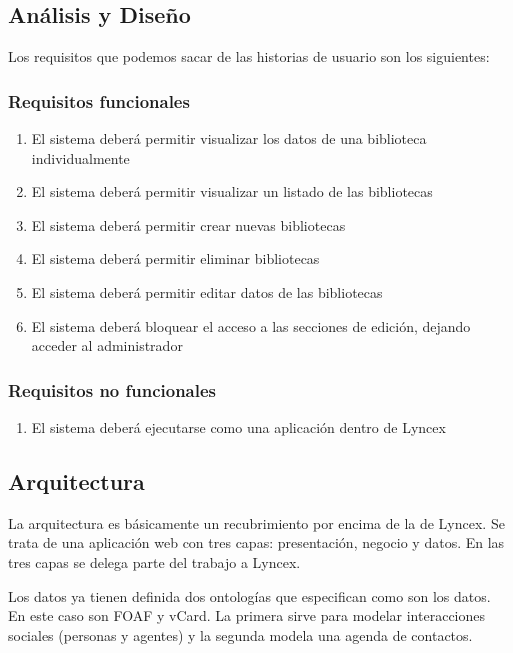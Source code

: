 \documentclass[12pt]{report} %
\begin{document}
\subsection{Análisis y Diseño}

Los requisitos que podemos sacar de las historias de usuario son los siguientes:

\subsubsection{Requisitos funcionales}
\begin{enumerate}
    \item El sistema deberá permitir visualizar los datos de una biblioteca individualmente
    \item El sistema deberá permitir visualizar un listado de las bibliotecas
    \item El sistema deberá permitir crear nuevas bibliotecas 
    \item El sistema deberá permitir eliminar bibliotecas
    \item El sistema deberá permitir editar datos de las bibliotecas
    \item El sistema deberá bloquear el acceso a las secciones de edición, dejando acceder al administrador
\end{enumerate}
\subsubsection{Requisitos no funcionales}
\begin{enumerate}
    \item El sistema deberá ejecutarse como una aplicación dentro de Lyncex
\end{enumerate}

\subsection{Arquitectura}

La arquitectura es básicamente un recubrimiento por encima de la de Lyncex. Se trata de una aplicación web con tres capas: presentación, negocio y datos. En las tres capas se delega parte del trabajo a Lyncex.

Los datos ya tienen definida dos ontologías que especifican como son los datos. En este caso son FOAF y vCard. La primera sirve para modelar interacciones sociales (personas y agentes) y la segunda modela una agenda de contactos. 
\end{document}
